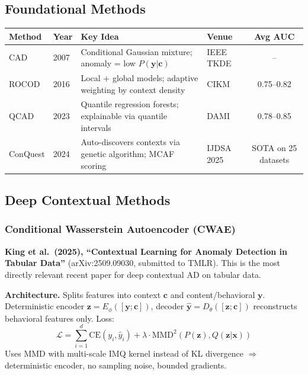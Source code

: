 \documentclass[11pt]{article}
\begin{document}
\subsection{Foundational Methods}

\begin{center}
\small
\begin{tabular}{p{2cm}lp{4cm}lc}
\toprule
\textbf{Method} & \textbf{Year} & \textbf{Key Idea} & \textbf{Venue} & \textbf{Avg AUC} \\
\midrule
CAD & 2007 & Conditional Gaussian mixture; anomaly = low $P(\mathbf{y}|\mathbf{c})$ & IEEE TKDE & -- \\
ROCOD & 2016 & Local + global models; adaptive weighting by context density & CIKM & 0.75--0.82 \\
QCAD & 2023 & Quantile regression forests; explainable via quantile intervals & DAMI & 0.78--0.85 \\
ConQuest & 2024 & Auto-discovers contexts via genetic algorithm; MCAF scoring & IJDSA 2025 & SOTA on 25 datasets \\
\bottomrule
\end{tabular}
\end{center}

\subsection{Deep Contextual Methods}

\subsubsection{Conditional Wasserstein Autoencoder (CWAE)}

\textbf{King et al.\ (2025), ``Contextual Learning for Anomaly Detection in Tabular Data''} (arXiv:2509.09030, submitted to TMLR). This is the most directly relevant recent paper for deep contextual AD on tabular data.

\textbf{Architecture.} Splits features into context $\mathbf{c}$ and content/behavioral $\mathbf{y}$. Deterministic encoder $\mathbf{z} = E_\phi([\mathbf{y}; \mathbf{c}])$, decoder $\hat{\mathbf{y}} = D_\theta([\mathbf{z}; \mathbf{c}])$ reconstructs behavioral features only. Loss:
\begin{equation*}
\mathcal{L} = \sum_{i=1}^{d} \mathrm{CE}(y_i, \hat{y}_i) + \lambda \cdot \mathrm{MMD}^2(P(\mathbf{z}), Q(\mathbf{z}|\mathbf{x}))
\end{equation*}
Uses MMD with multi-scale IMQ kernel instead of KL divergence $\Rightarrow$ deterministic encoder, no sampling noise, bounded gradients.
\end{document}
